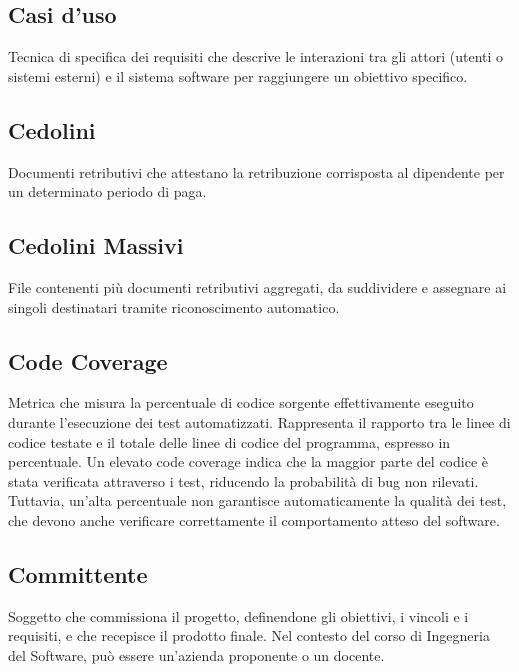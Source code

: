 \documentclass[a4paper,11pt]{article}
\begin{document}
\subsection{Casi d'uso}
Tecnica di specifica dei requisiti che descrive le interazioni tra gli attori (utenti o sistemi esterni) e il sistema software per raggiungere un obiettivo specifico.







\subsection{Cedolini}
Documenti retributivi che attestano la retribuzione corrisposta al dipendente per un determinato periodo di paga.






\subsection{Cedolini Massivi}
File contenenti più documenti retributivi aggregati, da suddividere e assegnare ai singoli destinatari tramite riconoscimento automatico.









\subsection{Code Coverage}
Metrica che misura la percentuale di codice sorgente effettivamente eseguito durante l'esecuzione dei test automatizzati. Rappresenta il rapporto tra le linee di codice testate e il totale delle linee di codice del programma, espresso in percentuale. Un elevato code coverage indica che la maggior parte del codice è stata verificata attraverso i test, riducendo la probabilità di bug non rilevati. Tuttavia, un'alta percentuale non garantisce automaticamente la qualità dei test, che devono anche verificare correttamente il comportamento atteso del software.







\subsection{Committente}
Soggetto che commissiona il progetto, definendone gli obiettivi, i vincoli e i requisiti, e che recepisce il prodotto finale. Nel contesto del corso di Ingegneria del Software, può essere un'azienda proponente o un docente.
\end{document}
